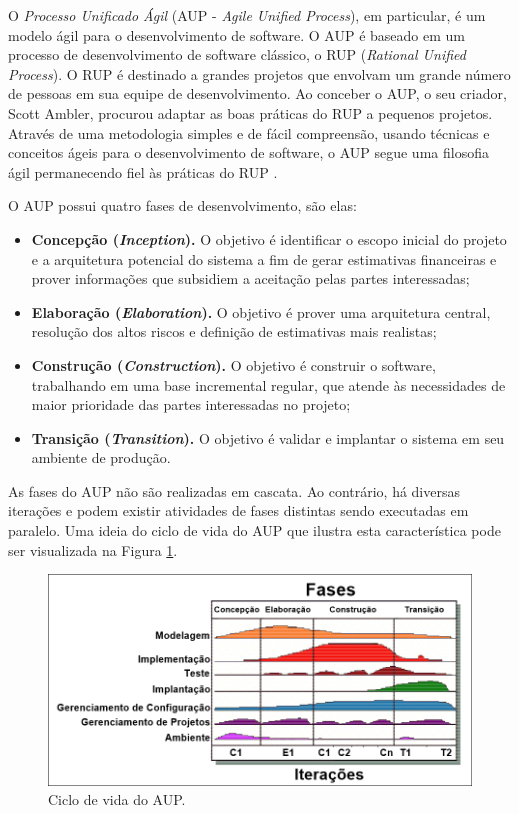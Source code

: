 O \emph{Processo Unificado Ágil} (AUP - \textit{Agile Unified Process}), em particular, é um modelo ágil para o desenvolvimento de software. O AUP é baseado em um processo de desenvolvimento de software clássico, o RUP (\textit{Rational Unified Process}). O RUP é destinado a grandes projetos que envolvam um grande número de pessoas em sua equipe de desenvolvimento. Ao conceber o AUP, o seu criador, Scott Ambler, procurou adaptar as boas práticas do RUP a pequenos projetos. Através de uma metodologia simples e de fácil compreensão, usando técnicas e conceitos ágeis para o desenvolvimento de software, o AUP segue uma filosofia ágil permanecendo fiel às práticas do RUP \cite{Ambler:Livro}.


O AUP possui quatro fases de desenvolvimento, são elas:

\begin{itemize}
	\item \textbf{Concepção (\textit{Inception}).} O objetivo é identificar o escopo inicial do projeto e a arquitetura potencial do sistema a fim de gerar estimativas financeiras e prover informações que subsidiem a aceitação pelas partes interessadas;
	\item \textbf{Elaboração (\textit{Elaboration}).} O objetivo é prover uma arquitetura central, resolução dos altos riscos e definição de estimativas mais realistas;
	\item \textbf{Construção (\textit{Construction}).} O objetivo é construir o software, trabalhando em uma base incremental regular, que atende às necessidades de maior prioridade das partes interessadas no projeto;
	\item \textbf{Transição (\textit{Transition}).} O objetivo é validar e implantar o sistema em seu ambiente de produção.
\end{itemize}

As fases do AUP não são realizadas em cascata. Ao contrário, há diversas iterações e podem existir atividades de fases distintas sendo executadas em paralelo. Uma ideia do ciclo de vida do AUP que ilustra esta característica pode ser visualizada na Figura \ref{fig:aupciclo}.

\begin{figure}[H]
	\centering
	\includegraphics[scale=0.7]{./img/aupOficial.png}
	\caption{Ciclo de vida do AUP.} \label{fig:aupciclo}
\end{figure}

